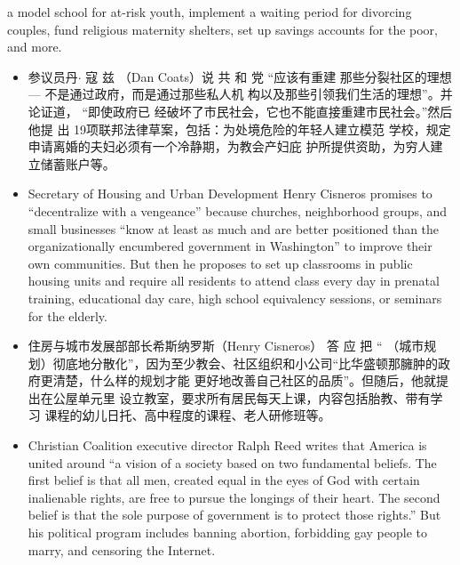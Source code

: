 \begin{paracol}{2}
\begin{itemize}
	a model school for at-risk youth, implement a waiting period
	for divorcing couples, fund religious maternity shelters, set
	up savings accounts for the poor, and more.
\end{itemize}
\switchcolumn
\begin{itemize}
	\item  参议员丹$\cdot$ 寇 兹 （Dan  Coats）说 共 和 党 “应该有重建
	那些分裂社区的理想 --- 不是通过政府，而是通过那些私人机
	构以及那些引领我们生活的理想”。并论证道， “即使政府已
	经破坏了市民社会，它也不能直接重建市民社会。”然后他提
	出 19项联邦法律草案，包括：为处境危险的年轻人建立模范
	学校，规定申请离婚的夫妇必须有一个冷静期，为教会产妇庇
	护所提供资助，为穷人建立储蓄账户等。
\end{itemize}
\switchcolumn*
\begin{itemize}
	\item Secretary of Housing and Urban Development Henry Cisneros promises to ``decentralize with a vengeance'' because
	churches, neighborhood groups, and small businesses ``know
	at least as much and are better positioned than the organizationally encumbered government in Washington'' to improve their own communities. But then he proposes to set up
	classrooms in public housing units and require all residents to attend class every day in prenatal training, educational
	day care, high school equivalency sessions, or seminars for
	the elderly.
\end{itemize}
\switchcolumn
\begin{itemize}
	\item 住房与城市发展部部长希斯纳罗斯（Henry Cisneros） 答
	应 把 “ （城市规划）彻底地分散化”，因为至少教会、社区组织和小公司“比华盛顿那臃肿的政府更清楚，什么样的规划才能
	更好地改善自己社区的品质”。但随后，他就提出在公屋单元里
	设立教室，要求所有居民每天上课，内容包括胎教、带有学习
	课程的幼儿日托、高中程度的课程、老人研修班等。
\end{itemize}
\switchcolumn*
\begin{itemize}
	\item Christian Coalition executive director Ralph Reed writes that
	America is united around ``a vision of a society based on two
	fundamental beliefs. The first belief is that all men, created
	equal in the eyes of God with certain inalienable rights, are
	free to pursue the longings of their heart. The second belief is
	that the sole purpose of government is to protect those
	rights.'' But his political program includes banning abortion,
	forbidding gay people to marry, and censoring the Internet.

\end{itemize}
\end{paracol}
